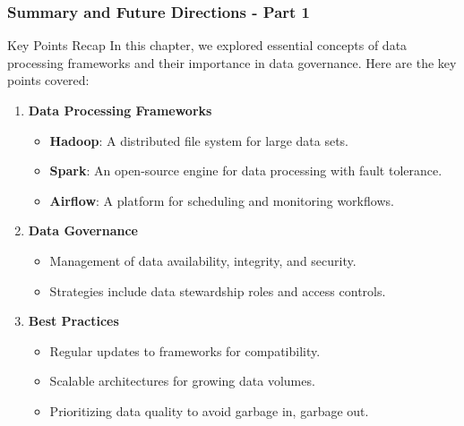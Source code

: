 \documentclass[aspectratio=169]{beamer}
\begin{document}
\begin{frame}[fragile]
    \frametitle{Summary and Future Directions - Part 1}
    \begin{block}{Key Points Recap}
        In this chapter, we explored essential concepts of data processing frameworks and their importance in data governance. Here are the key points covered:
    \end{block}
    
    \begin{enumerate}
        \item \textbf{Data Processing Frameworks}
        \begin{itemize}
            \item \textbf{Hadoop}: A distributed file system for large data sets.
            \item \textbf{Spark}: An open-source engine for data processing with fault tolerance.
            \item \textbf{Airflow}: A platform for scheduling and monitoring workflows.
        \end{itemize}

        \item \textbf{Data Governance}
        \begin{itemize}
            \item Management of data availability, integrity, and security.
            \item Strategies include data stewardship roles and access controls.
        \end{itemize}

        \item \textbf{Best Practices}
        \begin{itemize}
            \item Regular updates to frameworks for compatibility.
            \item Scalable architectures for growing data volumes.
            \item Prioritizing data quality to avoid garbage in, garbage out.
        \end{itemize}
    \end{enumerate}
\end{frame}
\end{document}
